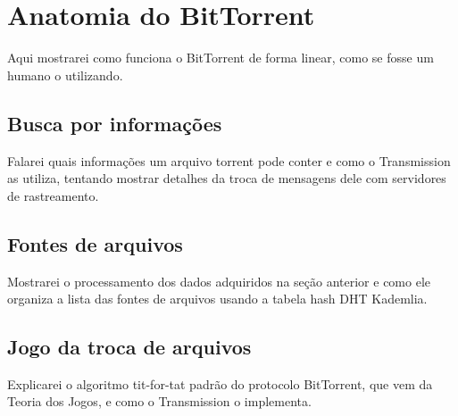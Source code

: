 
\chapter{Anatomia do BitTorrent}

Aqui mostrarei como funciona o BitTorrent de forma linear, como se fosse um humano o
utilizando.

\section{Busca por informações}

Falarei quais informações um arquivo torrent pode conter e como o Transmission as
utiliza, tentando mostrar detalhes da troca de mensagens dele com servidores de
rastreamento.

\section{Fontes de arquivos}

Mostrarei o processamento dos dados adquiridos na seção anterior e como ele organiza a lista das fontes de arquivos usando a tabela hash DHT Kademlia.

\section{Jogo da troca de arquivos}

Explicarei o algoritmo tit-for-tat padrão do protocolo BitTorrent, que vem da Teoria dos Jogos, e como o Transmission o implementa.

\afterpage{\clearpage}